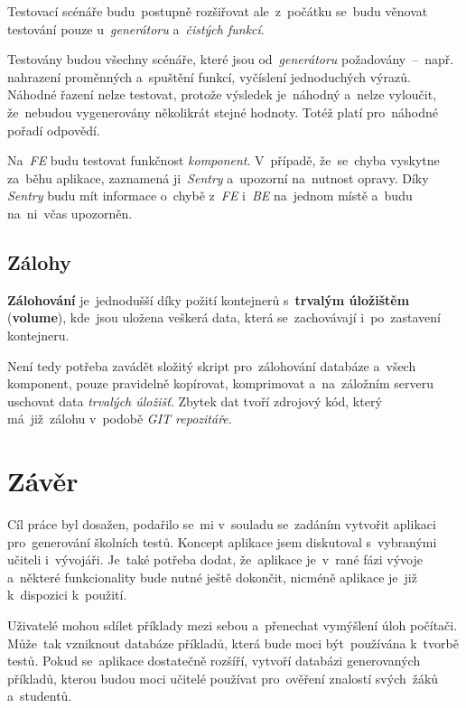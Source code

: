 \documentclass[11pt,a4paper]{report}
\let\oldacrshort\acrshort
\renewcommand{\acrshort}[1]{\emph{\normalsize\color[rgb]{0,0,0}\noindent\oldacrshort{#1}}}
\begin{document}
            Testovací scénáře budu~postupně rozšiřovat ale~z~počátku se~budu věnovat testování pouze u~\emph{generátoru} a~\emph{čistých funkcí}.

            Testovány budou všechny scénáře, které jsou od~\emph{generátoru} požadovány~--~např. nahrazení proměnných a~spuštění funkcí, vyčíslení jednoduchých výrazů. Náhodné řazení nelze testovat, protože výsledek je~náhodný a~nelze vyloučit, že~nebudou vygenerovány několikrát stejné hodnoty. Totéž platí pro~náhodné pořadí odpovědí.

            Na~\acrshort{FE} budu testovat funkčnost \emph{komponent}. V~případě, že~se~chyba vyskytne za~běhu aplikace, zaznamená ji~\emph{Sentry} a~upozorní na~nutnost opravy. Díky \emph{Sentry} budu mít informace o~chybě z~\acrshort{FE} i~\acrshort{BE} na~jednom místě a~budu na~ni~včas upozorněn.

        \section{Zálohy}
            \textbf{Zálohování} je~jednodušší díky požití kontejnerů s~\textbf{trvalým úložištěm} (\textbf{volume}), kde~jsou uložena veškerá data, která se~zachovávají i~po~zastavení kontejneru.
            
            Není tedy potřeba zavádět složitý skript pro~zálohování databáze a~všech komponent, pouze pravidelně kopírovat, komprimovat a~na~záložním serveru uschovat data \emph{trvalých úložišť}. Zbytek dat tvoří zdrojový kód, který má~již~zálohu v~podobě \emph{GIT repozitáře}.
        
            
    \chapter{Závěr}
        Cíl práce byl dosažen, podařilo se~mi v~souladu se~zadáním vytvořit aplikaci pro~generování školních testů. Koncept aplikace jsem diskutoval s~vybranými učiteli i~vývojáři. Je~také potřeba dodat, že~aplikace je~v~rané fázi vývoje a~některé funkcionality bude nutné ještě dokončit, nicméně aplikace je~již k~dispozici k~použití.
        
        Uživatelé mohou sdílet příklady mezi sebou a~přenechat vymýšlení úloh počítači. Může~tak vzniknout databáze příkladů, která bude moci být~používána k~tvorbě testů. Pokud se~aplikace dostatečně rozšíří, vytvoří databázi generovaných příkladů, kterou budou moci učitelé používat pro~ověření znalostí svých~žáků a~studentů.
        
\end{document}
